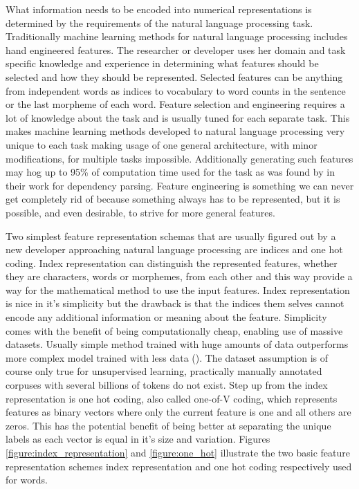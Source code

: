 \documentclass[12pt,a4paper,english
]{tutthesis}
\begin{document}
What information needs to be encoded into numerical representations is determined by the requirements of the natural language processing task. Traditionally machine learning methods for natural language processing includes hand engineered features. The researcher or developer uses her domain and task specific knowledge and experience in determining what features should be selected and how they should be represented. Selected features can be anything from independent words as indices to vocabulary to word counts in the sentence or the last morpheme of each word. Feature selection and engineering requires a lot of knowledge about the task and is usually tuned for each separate task. This makes machine learning methods developed to natural language processing very unique to each task making usage of one general architecture, with minor modifications, for multiple tasks impossible. Additionally generating such features may hog up to 95\% of computation time used for the task as was found by \cite{Chen2014} in their work for dependency parsing. Feature engineering is something we can never get completely rid of because something always has to be represented, but it is possible, and even desirable, to strive for more general features.

Two simplest feature representation schemas that are usually figured out by a new developer approaching natural language processing are indices and one hot coding. Index representation can distinguish the represented features, whether they are characters, words or morphemes, from each other and this way provide a way for the mathematical method to use the input features. Index representation is nice in it's simplicity but the drawback is that the indices them selves cannot encode any additional information or meaning about the feature. Simplicity comes with the benefit of being computationally cheap, enabling use of massive datasets. Usually simple method trained with huge amounts of data outperforms more complex model trained with less data (\cite{Mikolov2013}). The dataset assumption is of course only true for unsupervised learning, practically manually annotated corpuses with several billions of tokens do not exist. Step up from the index representation is one hot coding, also called one-of-V coding, which represents features as binary vectors where only the current feature is one and all others are zeros. This has the potential benefit of being better at separating the unique labels as each vector is equal in it's size and variation. Figures \ref{figure:index_representation} and \ref{figure:one_hot} illustrate the two basic feature representation schemes index representation and one hot coding respectively used for words.
\end{document}
